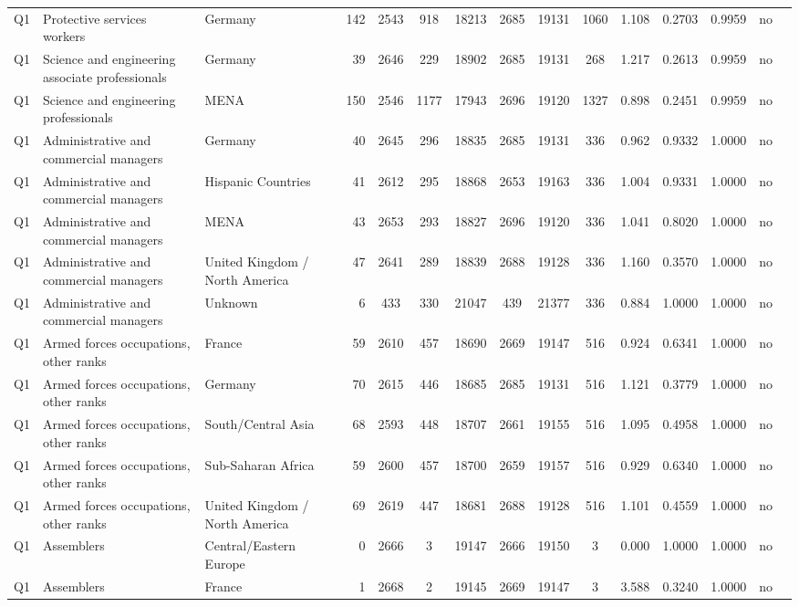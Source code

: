\begin{longtable}{lllrcccccccccll}
Q1 & Protective services workers & Germany & 142 & 2543 & 918 & 18213 & 2685 & 19131 & 1060 & 1.108 & 0.2703 & 0.9959 & no \\
Q1 & Science and engineering associate professionals & Germany & 39 & 2646 & 229 & 18902 & 2685 & 19131 & 268 & 1.217 & 0.2613 & 0.9959 & no \\
Q1 & Science and engineering professionals & MENA & 150 & 2546 & 1177 & 17943 & 2696 & 19120 & 1327 & 0.898 & 0.2451 & 0.9959 & no \\
Q1 & Administrative and commercial managers & Germany & 40 & 2645 & 296 & 18835 & 2685 & 19131 & 336 & 0.962 & 0.9332 & 1.0000 & no \\
Q1 & Administrative and commercial managers & Hispanic Countries & 41 & 2612 & 295 & 18868 & 2653 & 19163 & 336 & 1.004 & 0.9331 & 1.0000 & no \\
Q1 & Administrative and commercial managers & MENA & 43 & 2653 & 293 & 18827 & 2696 & 19120 & 336 & 1.041 & 0.8020 & 1.0000 & no \\
Q1 & Administrative and commercial managers & United Kingdom / North America & 47 & 2641 & 289 & 18839 & 2688 & 19128 & 336 & 1.160 & 0.3570 & 1.0000 & no \\
Q1 & Administrative and commercial managers & Unknown & 6 & 433 & 330 & 21047 & 439 & 21377 & 336 & 0.884 & 1.0000 & 1.0000 & no \\
Q1 & Armed forces occupations, other ranks & France & 59 & 2610 & 457 & 18690 & 2669 & 19147 & 516 & 0.924 & 0.6341 & 1.0000 & no \\
Q1 & Armed forces occupations, other ranks & Germany & 70 & 2615 & 446 & 18685 & 2685 & 19131 & 516 & 1.121 & 0.3779 & 1.0000 & no \\
Q1 & Armed forces occupations, other ranks & South/Central Asia & 68 & 2593 & 448 & 18707 & 2661 & 19155 & 516 & 1.095 & 0.4958 & 1.0000 & no \\
Q1 & Armed forces occupations, other ranks & Sub-Saharan Africa & 59 & 2600 & 457 & 18700 & 2659 & 19157 & 516 & 0.929 & 0.6340 & 1.0000 & no \\
Q1 & Armed forces occupations, other ranks & United Kingdom / North America & 69 & 2619 & 447 & 18681 & 2688 & 19128 & 516 & 1.101 & 0.4559 & 1.0000 & no \\
Q1 & Assemblers & Central/Eastern Europe & 0 & 2666 & 3 & 19147 & 2666 & 19150 & 3 & 0.000 & 1.0000 & 1.0000 & no \\
Q1 & Assemblers & France & 1 & 2668 & 2 & 19145 & 2669 & 19147 & 3 & 3.588 & 0.3240 & 1.0000 & no \\

\end{longtable}

